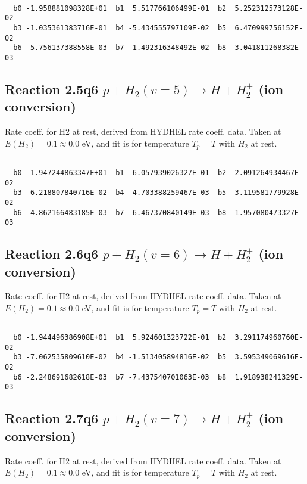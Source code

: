 \documentclass[12pt,dvipdfmx]{article}
\begin{document}
\begin{small}\begin{verbatim}

  b0 -1.958881098328E+01  b1  5.517766106499E-01  b2  5.252312573128E-02
  b3 -1.035361383716E-01  b4 -5.434555797109E-02  b5  6.470999756152E-02
  b6  5.756137388558E-03  b7 -1.492316348492E-02  b8  3.041811268382E-03

\end{verbatim}\end{small}

\newpage
\subsection{
Reaction 2.5q6
$ p + H_2(v=5) \rightarrow H + H_2^+$ (ion conversion)
}
Rate coeff. for H2 at rest, derived from HYDHEL rate coeff. data.
Taken at $E(H_2) = 0.1 \approx 0.0$ eV,  and fit is for temperature $T_p=T$ with $H_2$ at rest.

\begin{small}\begin{verbatim}

  b0 -1.947244863347E+01  b1  6.057939026327E-01  b2  2.091264934467E-02
  b3 -6.218807840716E-02  b4 -4.703388259467E-03  b5  3.119581779928E-02
  b6 -4.862166483185E-03  b7 -6.467370840149E-03  b8  1.957080473327E-03

\end{verbatim}\end{small}

\newpage
\subsection{
Reaction 2.6q6
$ p + H_2(v=6) \rightarrow H + H_2^+$ (ion conversion)
}
Rate coeff. for H2 at rest, derived from HYDHEL rate coeff. data.
Taken at $E(H_2) = 0.1 \approx 0.0$ eV,  and fit is for temperature $T_p=T$ with $H_2$ at rest.

\begin{small}\begin{verbatim}

  b0 -1.944496386908E+01  b1  5.924601323722E-01  b2  3.291174960760E-02
  b3 -7.062535809610E-02  b4 -1.513405894816E-02  b5  3.595349069616E-02
  b6 -2.248691682618E-03  b7 -7.437540701063E-03  b8  1.918938241329E-03

\end{verbatim}\end{small}

\newpage
\subsection{
Reaction 2.7q6
$ p + H_2(v=7) \rightarrow H + H_2^+$ (ion conversion)
}
Rate coeff. for H2 at rest, derived from HYDHEL rate coeff. data.
Taken at $E(H_2) = 0.1 \approx 0.0$ eV,  and fit is for temperature $T_p=T$ with $H_2$ at rest.
\end{document}
